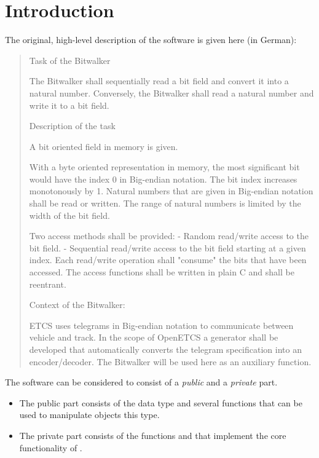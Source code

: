 
\chapter{Introduction}
\label{sec:introduction}

The original, high-level description of the \bitwalker software is given here (in German):

\begin{quote}
 
Task of the Bitwalker
 
The Bitwalker shall sequentially read a bit field and convert it into a natural number.
Conversely, the Bitwalker shall read a natural number and write it to a bit field.
 
Description of the task
 
A bit oriented field in memory is given.

With a byte oriented representation in memory, the most significant bit
would have the index 0 in Big-endian notation.
The bit index increases monotonously by 1.
Natural numbers that are given in Big-endian notation shall be read or written.
The range of natural numbers is limited by the width of the bit field.

Two access methods shall be provided:
- Random read/write access to the bit field. 
- Sequential read/write access to the bit field starting at a given index.
Each read/write operation shall "consume" the bits that have been accessed.
The access functions shall be written in plain C and shall be reentrant.
 
Context of the Bitwalker:
 
ETCS uses telegrams in Big-endian notation to communicate between vehicle and track.
In the scope of OpenETCS a generator shall be developed that
automatically converts the telegram specification into an encoder/decoder.
The Bitwalker will be used here as an auxiliary function.
\end{quote}






The \bitwalker software can be considered to consist of a \emph{public}
and a \emph{private} part.
\begin{itemize}
\item
The public part consists of the \isoc data type \bitwalkertype and several \isoc functions
that can be used to manipulate objects this type.

\item
The private part consists of the functions \peek and \poke
that implement the core functionality of \bitwalker.
\end{itemize}

